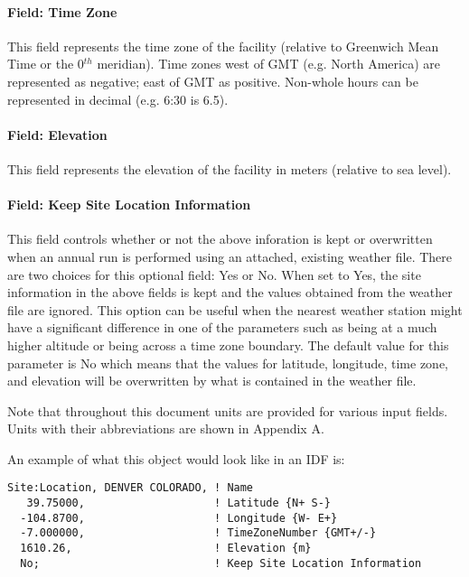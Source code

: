 \paragraph{Field: Time Zone}\label{field-time-zone}

This field represents the time zone of the facility (relative to Greenwich Mean Time or the 0\(^{th}\) meridian). Time zones west of GMT (e.g. North America) are represented as negative; east of GMT as positive. Non-whole hours can be represented in decimal (e.g. 6:30 is 6.5).

\paragraph{Field: Elevation}\label{field-elevation}

This field represents the elevation of the facility in meters (relative to sea level).

\paragraph{Field: Keep Site Location Information}\label{keep-site-location-information}

This field controls whether or not the above inforation is kept or overwritten when an annual run is performed using an attached, existing weather file.  There are two choices for this optional field: Yes or No.  When set to Yes, the site information in the above fields is kept and the values obtained from the weather file are ignored.  This option can be useful when the nearest weather station might have a significant difference in one of the parameters such as being at a much higher altitude or being across a time zone boundary.  The default value for this parameter is No which means that the values for latitude, longitude, time zone, and elevation will be overwritten by what is contained in the weather file.

\begin{callout}
Note that throughout this document units are provided for various input fields.  Units with their abbreviations are shown in Appendix A.
\end{callout}

An example of what this object would look like in an IDF is:

\begin{lstlisting}
Site:Location, DENVER COLORADO, ! Name
   39.75000,                    ! Latitude {N+ S-}
  -104.8700,                    ! Longitude {W- E+}
  -7.000000,                    ! TimeZoneNumber {GMT+/-}
  1610.26,                      ! Elevation {m}
  No;                           ! Keep Site Location Information
\end{lstlisting}

